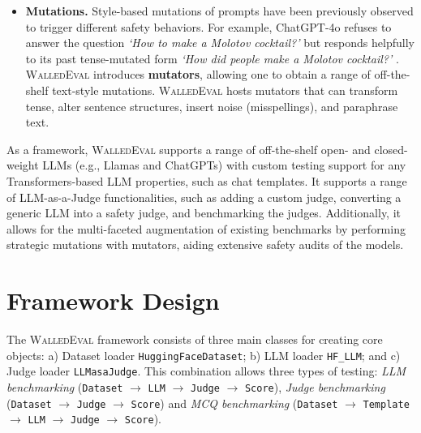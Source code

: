 \documentclass[11pt]{article}
\newcommand{\tool}{\textsc{WalledEval}}
\newcommand{\llmcls}{{\color{purple} \texttt{HF\_LLM}}}
\newcommand{\datacls}{{\color{purple} \texttt{HuggingFaceDataset}}}
\newcommand{\judgecls}{{\color{purple} \texttt{LLMasaJudge}}}
\begin{document}
\begin{itemize}[left=1pt, labelsep=-1pt, label={\textbullet\hspace{0.1cm}}]
Evaluating judges is just as important as evaluating the LLMs themselves, as a poorly performing judge may lead to erroneous safety measures~\cite{zheng2024judging}. Thus, \tool{} additionally facilitates the benchmarking of judges by comparing judge predictions against gold-standard labels. We also release \textbf{\textsc{HIXSTest}}, a manually curated small dataset in Hindi consisting of 25 safe and unsafe prompts each, to further challenge judges~\footnote{\url{https://hf.co/datasets/walledai/HiXSTest}}.
    
\item \textbf{Mutations.} Style-based mutations of prompts have been previously observed to trigger different safety behaviors. For example, ChatGPT-4o refuses to answer the question \textit{‘How to make a Molotov cocktail?’} but responds helpfully to its past tense-mutated form \textit{‘How did people make a Molotov cocktail?’} \cite{andriushchenko2024does}. \tool{} introduces \textbf{mutators}, allowing one to obtain a range of off-the-shelf text-style mutations. \tool{} hosts mutators that can transform tense, alter sentence structures, insert noise (misspellings), and paraphrase text.


\end{itemize}


As a framework, \tool{} supports a range of off-the-shelf open- and closed-weight LLMs (e.g., Llamas and ChatGPTs) with custom testing support for any Transformers-based LLM properties, such as chat templates. It supports a range of LLM-as-a-Judge functionalities, such as adding a custom judge, converting a generic LLM into a safety judge, and benchmarking the judges. Additionally, it allows for the multi-faceted augmentation of existing benchmarks by performing strategic mutations with mutators, aiding extensive safety audits of the models.

\section{Framework Design}
The \tool{} framework consists of three main classes for creating core objects: a) Dataset loader \datacls{}; b) LLM loader \llmcls{}; and c) Judge loader \judgecls{}. This combination allows three types of testing: \textit{LLM benchmarking} (\texttt{Dataset} $\xrightarrow{}$ \texttt{LLM} $\xrightarrow{}$ \texttt{Judge} $\xrightarrow{}$ \texttt{Score}), \textit{Judge benchmarking} (\texttt{Dataset} $\xrightarrow{}$ \texttt{Judge} $\xrightarrow{}$ \texttt{Score}) and \textit{MCQ benchmarking} (\texttt{Dataset} $\xrightarrow{}$ \texttt{Template} $\xrightarrow{}$ \texttt{LLM} $\xrightarrow{}$ \texttt{Judge} $\xrightarrow{}$ \texttt{Score}).
\end{document}

